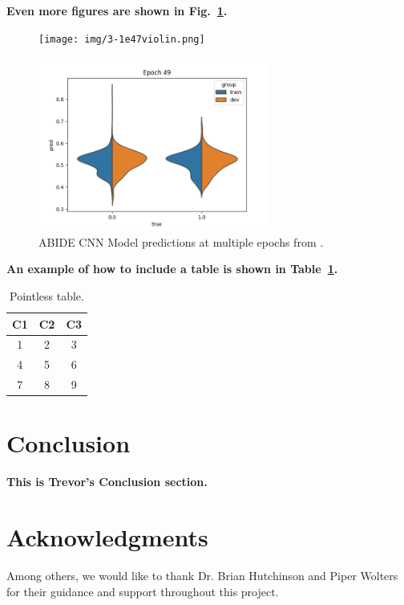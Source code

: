 \documentclass[conference, letterpaper, 11pt]{IEEEtran}
\begin{document}
\textbf{Even more figures are shown in Fig.~\ref{fig:xmp2}.} \lipsum[1]

\begin{figure}[htbp]
    \centerline{\texttt{[image: img/3-1e47violin.png]}}
    \centerline{\includegraphics[width=3in]{img/3-1e49violin.png}}
    \caption{ABIDE CNN Model predictions at multiple epochs from \cite{aiad}.}
    \label{fig:xmp2}
\end{figure}

\textbf{An example of how to include a table is shown in Table~\ref{tab:xmp}.} \lipsum[1]

\begin{table}[htbp]
    \caption{Pointless table.}
    \begin{center}
        \begin{tabular}{|c|c|c|}
            \hline
            \textbf{C1} & \textbf{C2} & \textbf{C3} \\
            \hline
            1 & 2 & 3 \\
            4 & 5 & 6 \\
            7 & 8 & 9 \\
            \hline
        \end{tabular}
    \end{center}
    \label{tab:xmp}
\end{table}

\colorbox{red}{}
\colorbox{red}{}

\lipsum[1-10]

\section{Conclusion} \label{CO}
\textbf{This is Trevor's Conclusion section.} \lipsum[1-2]

\section*{Acknowledgments}

Among others, we would like to thank Dr. Brian Hutchinson and Piper Wolters for their guidance and support throughout this project. \lipsum[][1-2]

\printbibliography
\end{document}
